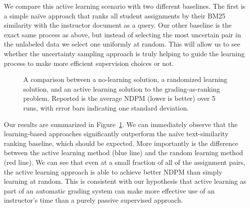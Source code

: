 We compare this active learning scenario with two different baselines. The
first is a simple na\"ive approach that ranks all student assignments by
their BM25 similarity with the instructor document as a query. Our other
baseline is the exact same process as above, but instead of selecting the
most uncertain pair in the unlabeled data we select one uniformly at
random. This will allow us to see whether the uncertainty sampling approach
is truly helping to guide the learning process to make more efficient
supervision choices or not.

\begin{figure}
  \begin{center}
  \caption{A comparison between a no-learning solution, a randomized
  learning solution, and an active learning solution to the
  grading-as-ranking problem. Reported is the average NDPM (lower is
  better) over 5 runs, with error bars indicating one standard deviation.}
  \label{fig:active-learning}
  \end{center}
\end{figure}

Our results are summarized in Figure~\ref{fig:active-learning}. We can
immediately observe that the learning-based approaches significantly
outperform the na\"ive text-similarity ranking baseline, which should be
expected. More importantly is the difference between the active learning
method (blue line) and the random learning method (red line). We can see
that even at a small fraction of all of the assignment pairs, the active
learning approach is able to achieve better NDPM than simply learning at
random. This is consistent with our hypothesis that active learning as part
of an automatic grading system can make more effective use of an
instructor's time than a purely passive supervised approach.

